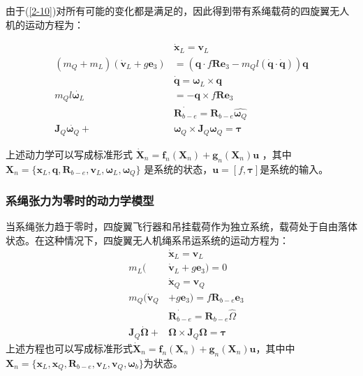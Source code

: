 \documentclass[lang=chs, degree=master, blindreview=false, winfonts=true]{yanputhesis}
\begin{document}
由于(\ref{2-10})对所有可能的变化都是满足的，因此得到带有系绳载荷的四旋翼无人机的运动方程为：

\begin{equation}
	\begin{aligned}
		&\dot{\bm x}_{L}=\bm v_{L} \\
		(m_Q+m_L)(\dot{\bm v}_L+g\bm e_3)& =(\bm q\cdot f\bm R\bm e_3-m_Ql(\dot{\bm q}\cdot\dot{\bm q}))\bm q \\
		&\dot{\bm q}=\bm \omega_L\times \bm q \\
		m_{Q}l \dot{\bm \omega_L}&=-\bm q\times f\bm R\bm e_{3} \\
		&\dot{\bm R_{b-e}}=\bm R_{b-e}\hat{\bm  \omega_Q} \\
		\bm J_{Q}\dot{\bm  \omega_Q}+&\bm  \omega_Q\times \bm J_{Q}\bm  \omega_Q=\bm \tau
	\end{aligned}
\end{equation}

上述动力学可以写成标准形式 $\dot{\bm X}_n=\bm f_n(\bm X_n)+\bm g_n(\bm X_n)\bm u$ ，其中 $\bm X_n = \{\bm x_L,\bm q,\bm R_{b-e},\bm v_L,\bm \omega_L,\bm \omega_Q\}$ 是系统的状态，$\bm u = \left[f,\bm \tau \right]$是系统的输入。
\subsubsection{系绳张力为零时的动力学模型}
当系绳张力趋于零时，四旋翼飞行器和吊挂载荷作为独立系统，载荷处于自由落体状态。在这种情况下，四旋翼无人机绳系吊运系统的运动方程为：
\begin{equation}
	\begin{aligned}
	&\dot{\bm x}_{L}=\bm v_{L}\\
	\quad m_{L}(&\dot{\bm v}_{L}+g\bm e_{3})=0\\
	&\dot{\bm x}_{Q}=\bm v_{Q}\\
	\quad m_{Q}(\dot{\bm v}_{Q}&+g\bm e_{3})=f\bm R_{b-e}\bm e_{3}\\
	&\dot{\bm R_{b-e}}=\bm R_{b-e}\hat{\Omega}\\
	\quad \bm J_{Q}\dot{\bm \Omega}+&\bm \Omega\times \bm J_{Q}\bm \Omega=\bm \tau
\end{aligned}
\end{equation}
上述方程也可以写成标准形式$\dot{\bm X}_n=\bm f_n(\bm X_n)+\bm g_n(\bm X_n)\bm u$，其中中$\bm X_n = \{\bm x_L,\bm x_Q,\bm R_{b-e},\bm v_L,\bm v_Q,\bm \omega_b\}$为状态。
\end{document}
